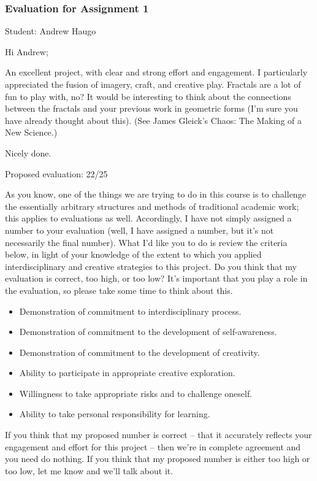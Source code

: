 \documentclass[letterpaper,10pt,DIV=9,headsepline]{scrreprt}
\begin{document}
\newpage

\subsubsection{Evaluation for Assignment 1}

Student: Andrew Haugo

\bigskip
Hi Andrew;

An excellent project, with clear and strong effort and engagement. I
particularly appreciated the fusion of imagery, craft, and
creative play. Fractals are a lot of fun to play with, no? It would be interesting to think about the connections between the fractals and your previous work in geometric forms (I'm sure you have already thought about this). (See James Gleick's Chaos: The Making of a New Science.)

Nicely done.


\bigskip
Proposed evaluation: 22/25

\bigskip
As you know, one of the things we are trying to do in this course is
to challenge the essentially arbitrary structures and methods of
traditional academic work; this applies to evaluations as well.
Accordingly, I have not simply assigned a number to your evaluation
(well, I have assigned a number, but it's not necessarily the final
number). What I'd like you to do is review the criteria below, in
light of your knowledge of the extent to which you applied
interdisciplinary and creative strategies to this project. Do you
think that my evaluation is correct, too high, or too low? It's
important that you play a role in the evaluation, so please take some
time to think about this.

\begin{itemize}
\item Demonstration of commitment to interdisciplinary process.
\item Demonstration of commitment to the development of self-awareness.
\item Demonstration of commitment to the development of creativity.
\item Ability to participate in appropriate creative exploration.
\item Willingness to take appropriate risks and to challenge oneself.
\item Ability to take personal responsibility for learning.
\end{itemize}

If you think that my proposed number is correct -- that it accurately
reflects your engagement and effort for this project -- then we're in
complete agreement and you need do nothing. If you think that my
proposed number is either too high or too low, let me know and we'll
talk about it.
\end{document}
